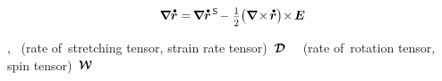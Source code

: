 \nopagebreak\vspace{-0.1em}\begin{equation*}
\boldnabla \mathdotabove{\currentlocationvector}
= \hspace{-0.2ex} \boldnabla \mathdotabove{\currentlocationvector}^{\hspace{.3ex}\mathsf{S}} \hspace{-0.25ex}
- \hspace{.1ex} \smalldisplaystyleonehalf \bigl( \boldnabla \hspace{-0.25ex}\times\hspace{-0.25ex} \mathdotabove{\currentlocationvector} \bigr) \hspace{-0.4ex} \times \hspace{-0.2ex} \UnitDyad
\end{equation*}

\vspace{-0.1em}\noindent
{},  ~(rate of~stretching tensor, strain rate tensor)~${\bm{\mathcal{D}}}$ ~~(rate of~rotation tensor, spin tensor)~${\vorticitytensor}$


